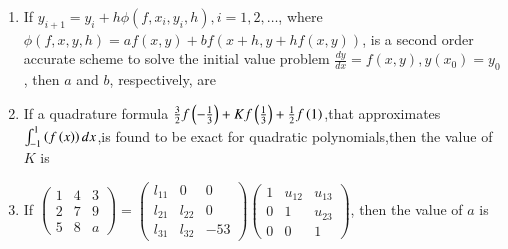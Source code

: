 \documentclass[journal,12pt,onecolumn]{IEEEtran}
\theoremstyle{remark}
\begin{document}
\begin{enumerate}
\item If  $y_{i+1} = y_i + h \phi(f, x_i, y_i, h), i = 1, 2, \ldots$,  where \\
$\phi(f, x, y, h) = a f(x, y) + b f(x + h, y + h f(x, y))$,  is a second order accurate scheme to solve the
initial value problem  $\frac{dy}{dx} = f(x, y), y(x_0) = y_0$,  then  $a$  and  $b$, respectively, are
\begin{enumerate}
\end{enumerate}

\item If a quadrature formula $\frac{3}{2}f\left(-\frac{1}{3}\right)+Kf\left(\frac{1}{3}\right)+\frac{1}{2}f\left(1\right)$,that approximates $\int_{-1}^{1}\left(f\left(x\right)\right)dx$,is found to be exact for quadratic polynomials,then the value of $K$ is
\begin{enumerate}
\end{enumerate}

\item If $\begin{pmatrix}
1 & 4 & 3 \\
2 & 7 & 9 \\
5 & 8 & a
\end{pmatrix} = 
\begin{pmatrix}
l_{11} & 0 & 0 \\
l_{21} & l_{22} & 0 \\
l_{31} & l_{32} & -53
\end{pmatrix}
\begin{pmatrix}
1 & u_{12} & u_{13} \\
0 & 1 & u_{23} \\
0 & 0 & 1
\end{pmatrix}$, then the value of $a$ is 
\begin{enumerate}
\end{enumerate}


\end{enumerate}
\end{document}

